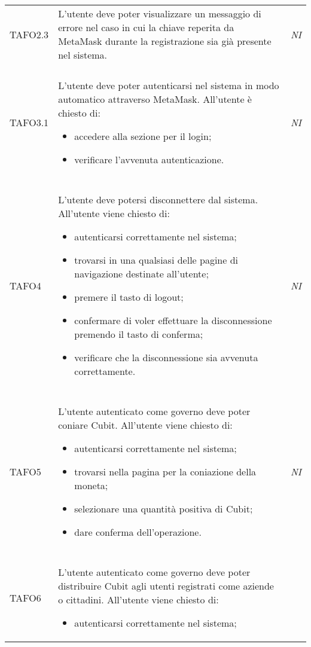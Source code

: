 \begin{longtable}{ >{\centering}p{} >{}p{}
			>{\centering}p{}}
\hypertarget{TAFO2.3}{TAFO2.3} & L'utente deve poter visualizzare un messaggio di errore nel caso in cui la
		 chiave reperita da MetaMask\glo{} durante la registrazione sia già presente
		 nel sistema. & \textit{NI}\\ \tabularnewline
\hypertarget{TAFO3.1}{TAFO3.1} & L'utente deve poter autenticarsi nel sistema in modo automatico attraverso
		 MetaMask\glo{}. All'utente è chiesto di:
		 \begin{itemize}
		 	\item accedere alla sezione per il login;
		 	\item verificare l'avvenuta autenticazione.
		 \end{itemize} & \textit{NI}\\ \tabularnewline
\hypertarget{TAFO4}{TAFO4} & L'utente deve potersi disconnettere dal sistema. All'utente viene chiesto di:
		 \begin{itemize}
		 	\item autenticarsi correttamente nel sistema;
		 	\item trovarsi in una qualsiasi delle pagine di navigazione destinate 
		 	all'utente;
		 	\item premere il tasto di logout;
		 	\item confermare di voler effettuare la disconnessione premendo il tasto 
		 	di conferma;
		 	\item verificare che la disconnessione sia avvenuta correttamente.
		 \end{itemize} & \textit{NI}\\ \tabularnewline
\hypertarget{TAFO5}{TAFO5} & L'utente autenticato come governo deve poter coniare Cubit\glo{}.
		 All'utente viene chiesto di:
		 \begin{itemize}
		 	\item autenticarsi correttamente nel sistema;
		 	\item trovarsi nella pagina per la coniazione della moneta;
		 	\item selezionare una quantità positiva di Cubit\glo{};
		 	\item dare conferma dell'operazione. 
		 \end{itemize} & \textit{NI}\\ \tabularnewline
\hypertarget{TAFO6}{TAFO6} & L'utente autenticato come governo deve poter distribuire Cubit\glo{}
		 agli utenti registrati come aziende o cittadini. All'utente viene chiesto di:
		 \begin{itemize}
		 	\item autenticarsi correttamente nel sistema;

\end{itemize}
\end{longtable}
